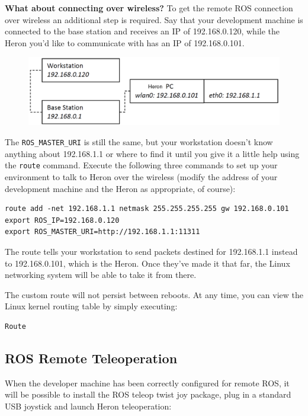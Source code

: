 \documentclass[]{clearpath-latex/clearpath-manual}
\begin{document}
\textbf{What about connecting over wireless?} To get the remote ROS connection over wireless an additional step is required. Say that your development machine is connected to the base station and receives an IP of 192.168.0.120, while the Heron you’d like to communicate with has an IP of 192.168.0.101.

\begin{figure}[h]
  \centering
  \includegraphics[width=0.75\linewidth]{h_wireless.PNG}
  \label{h_wireless}
\end{figure}

The \lstinline{ROS_MASTER_URI} is still the same, but your workstation doesn’t know anything about 192.168.1.1 or where to find it until you give it a little help using the \lstinline{route} command. Execute the following three commands to set up your environment to talk to Heron over the wireless (modify the address of your development machine and the Heron as appropriate, of course):

\begin{lstlisting}
route add -net 192.168.1.1 netmask 255.255.255.255 gw 192.168.0.101 
export ROS_IP=192.168.0.120 
export ROS_MASTER_URI=http://192.168.1.1:11311 
\end{lstlisting}

The route tells your workstation to send packets destined for 192.168.1.1 instead to 192.168.0.101, which is the Heron. Once they’ve made it that far, the Linux networking system will be able to take it from there.

The custom route will not persist between reboots. At any time, you can view the Linux kernel routing table by simply executing:

\begin{lstlisting}
Route
\end{lstlisting}

\subsection{ROS Remote Teleoperation}

When the developer machine has been correctly configured for remote ROS, it will be possible to install the ROS teleop twist joy package, plug in a standard USB joystick and launch Heron teleoperation:
\end{document}
